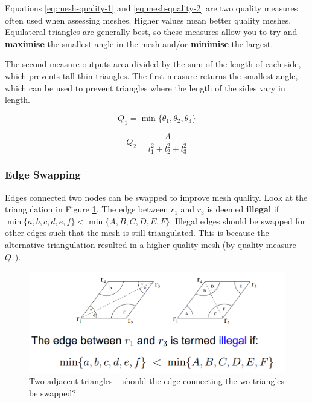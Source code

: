 \documentclass{article}
\begin{document}
Equations \ref{eq:mesh-quality-1} and \ref{eq:mesh-quality-2} are two quality measures often used when assessing meshes. Higher values mean better quality meshes. Equilateral triangles are generally best, so these measures allow you to try and \textbf{maximise} the smallest angle in the mesh and/or \textbf{minimise} the largest.

The second measure outputs area divided by the sum of the length of each side, which prevents tall thin triangles. The first measure returns the smallest angle, which can be used to prevent triangles where the length of the sides vary in length.

\begin{equation}
	Q_1 = \min \lbrace \theta_1, \theta_2, \theta_3 \rbrace
	\label{eq:mesh-quality-1}
\end{equation}

\begin{equation}
	Q_2 = \frac{A}{l_1^2 + l_2^2 + l_3^2}
	\label{eq:mesh-quality-2}
\end{equation}

\subsubsection{Edge Swapping}

Edges connected two nodes can be swapped to improve mesh quality. Look at the triangulation in Figure \ref{fig:edge-swapping}. The edge between $r_1$ and $r_3$ is deemed \textbf{illegal} if $\min \lbrace a, b, c, d, e, f \rbrace < \min \lbrace A, B, C, D, E,F \rbrace$.  Illegal edges should be swapped for other edges such that the mesh is still triangulated. This is because the alternative triangulation resulted in a higher quality mesh (by quality measure $Q_1$).

\begin{figure}
	\centering
	\includegraphics[scale=0.35]{figures/edge-swapping.png}
	\caption{Two adjacent triangles -- should the edge connecting the wo triangles be swapped?}
	\label{fig:edge-swapping}
\end{figure}
\end{document}
